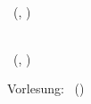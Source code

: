 \hypersetup{pdftitle = \titel}
\ifdefined\layoutanon
\hypersetup{pdfauthor = Anonymous}
\else
\hypersetup{pdfauthor = \autor}
\fi




\ifdefined\layouttinyheader
\begin{small}
\noindent \meta \\ \autor\ (\matrikelnummer, \email)
\end{small}
\vspace{0.5cm}
\fi

\ifdefined\layoutsmallheader
\begin{small}
\noindent \meta \\ \autor\ (\matrikelnummer, \email)
\end{small}
\vskip 1.0cm
\begin{center}\begin{Large}\titel\end{Large}\end{center}
\vskip 0.5cm
\fi

\ifdefined\layouttitle
\begin{center}
{%
    \scshape\Large\onehalfspacing
    \titel \par}
\end{center}
\vskip 0.5cm
\fi

\ifdefined\layoutzettel
\pagestyle{empty}
\newcommand{\header}{Vorlesung: \vorlesung \hfill  \autor \, (\matrikelnummer)\\ \zettel \hfill \gruppe \\ \datum}
\header
\fi

